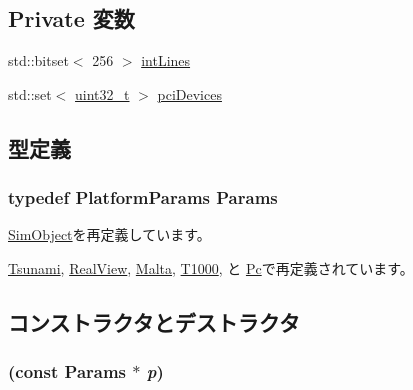 \subsection*{Private 変数}
\begin{DoxyCompactItemize}
\item 
std::bitset$<$ 256 $>$ \hyperlink{classPlatform_a978f892860786a70cfc97a3cacf4b7b6}{intLines}
\item 
std::set$<$ \hyperlink{Type_8hh_a435d1572bf3f880d55459d9805097f62}{uint32\_\-t} $>$ \hyperlink{classPlatform_a5a95b4e20e1bfcdd134457dc41de6fd5}{pciDevices}
\end{DoxyCompactItemize}


\subsection{型定義}
\hypertarget{classPlatform_af4e77eaf2602e4808deef7d1ba95e579}{
\subsubsection[{Params}]{\setlength{\rightskip}{0pt plus 5cm}typedef PlatformParams {\bf Params}}}
\label{classPlatform_af4e77eaf2602e4808deef7d1ba95e579}


\hyperlink{classSimObject_a0f0761d2db586a23bb2a2880b8f387bb}{SimObject}を再定義しています。

\hyperlink{classTsunami_a7beeeed12982def83e22faf17f7385e1}{Tsunami}, \hyperlink{classRealView_aa902b300d4e5553ea4f127d69fc0fa3a}{RealView}, \hyperlink{classMalta_a189ad6fd96fd77d2ea4e32ba0a9e5298}{Malta}, \hyperlink{classT1000_abc8ac05350758af915732ecded3a736e}{T1000}, と \hyperlink{classPc_a3cb59bd5a1945e535ba84d5e34ad19ec}{Pc}で再定義されています。

\subsection{コンストラクタとデストラクタ}
\hypertarget{classPlatform_a3741160d0c1f6688a4e38bc97bdd15d3}{
\subsubsection[{Platform}]{ (const {\bf Params} $\ast$ {\em p})}}
\label{classPlatform_a3741160d0c1f6688a4e38bc97bdd15d3}



